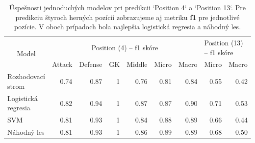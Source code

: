 \documentclass[runningheads]{llncs}
\begin{document}
\begin{table}[]
    \begin{tabular}{|l|rrrrrr|rr}
    \hline
    \multicolumn{1}{|c|}{\multirow{2}{*}{Model}} & \multicolumn{6}{c|}{Position (4) -- f1 skóre}                               & \multicolumn{2}{l|}{Position (13) -- f1 skóre} \\
    \multicolumn{1}{|c|}{}                       & Attack & Defense & GK         & Middle & Micro & \multicolumn{1}{l|}{Macro} & Micro       & \multicolumn{1}{l|}{Macro}       \\ \hline
    Rozhodovací strom                            & 0.74   & 0.87    & 1          & 0.76   & 0.81  & 0.84                       & 0.55        & \multicolumn{1}{r|}{0.42}        \\
    Logistická regresia                          & 0.82   & 0.94    & 1          & 0.87   & 0.87  & 0.90                       & 0.71        & \multicolumn{1}{r|}{0.53}        \\
    SVM                                          & 0.81   & 0.93    & 1          & 0.84   & 0.88  & 0.89                       & 0.66        & \multicolumn{1}{r|}{0.44}        \\
    Náhodný les                                  & 0.81   & 0.93    & 1          & 0.86   & 0.89  & 0.89                       & 0.68        & \multicolumn{1}{r|}{0.50}        \\ \hline
    \end{tabular}
    \\
    \caption{\label{tab:f1_position_4} Úspešnosti jednoduchých modelov pri predikcii `Position 4` a `Position 13`. Pre predikciu štyroch herných pozícií zobrazujeme aj metriku \textbf{f1} pre jednotlivé pozície. V oboch prípadoch bola najlepšia logistická regresia a náhodný les.}
\end{table}
\end{document}
